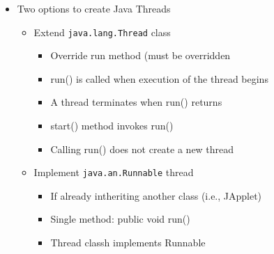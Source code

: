 \documentclass[a4paper]{article}
\newcommand{\inline}[1]{\lstinline!#1!}%
\begin{document}
\begin{itemize}
\begin{center}
			\end{center}
		\item Two options to create Java Threads
			\begin{itemize}
				\item Extend \inline{java.lang.Thread} class
					\begin{itemize}
						\item Override run method (must be overridden
						\item run() is called when execution of the thread begins
						\item A thread terminates when run() returns
						\item start() method invokes run()
						\item Calling run() does not create a new thread
					\end{itemize}
				\item Implement \inline{java.an.Runnable} thread
					\begin{itemize}
						\item If already intheriting another class (i.e., JApplet)
						\item Single method: public void run()
						\item Thread classh implements Runnable
					\end{itemize}
			\end{itemize}

	\end{itemize}


\setcounter{section}{10}%
\end{document}
